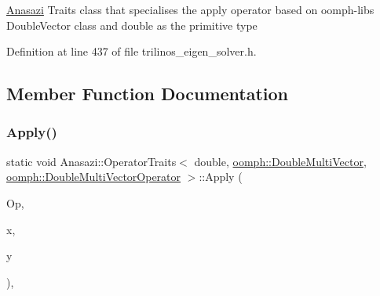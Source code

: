 \hyperlink{namespaceAnasazi}{Anasazi} Traits class that specialises the apply operator based on oomph-\/lib\textquotesingle{}s Double\+Vector class and double as the primitive type 

Definition at line 437 of file trilinos\+\_\+eigen\+\_\+solver.\+h.



\subsection{Member Function Documentation}
\mbox{\label{classAnasazi_1_1OperatorTraits_3_01double_00_01oomph_1_1DoubleMultiVector_00_01oomph_1_1DoubleMultiVectorOperator_01_4_a08de8f353951f165e291a6074d8aea99}} 
\subsubsection{\texorpdfstring{Apply()}{Apply()}}
{\footnotesize\ttfamily static void Anasazi\+::\+Operator\+Traits$<$ double, \hyperlink{classoomph_1_1DoubleMultiVector}{oomph\+::\+Double\+Multi\+Vector}, \hyperlink{classoomph_1_1DoubleMultiVectorOperator}{oomph\+::\+Double\+Multi\+Vector\+Operator} $>$\+::Apply (\begin{DoxyParamCaption}\item[{const \hyperlink{classoomph_1_1DoubleMultiVectorOperator}{oomph\+::\+Double\+Multi\+Vector\+Operator} \&}]{Op,  }\item[{const \hyperlink{classoomph_1_1DoubleMultiVector}{oomph\+::\+Double\+Multi\+Vector} \&}]{x,  }\item[{\hyperlink{classoomph_1_1DoubleMultiVector}{oomph\+::\+Double\+Multi\+Vector} \&}]{y }\end{DoxyParamCaption})\hspace{0.3cm}{\ttfamily [inline]}, {\ttfamily [static]}}



